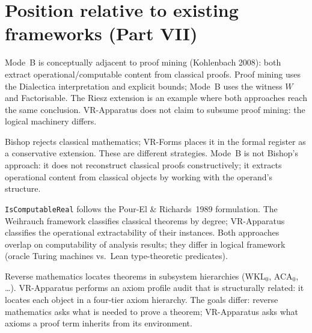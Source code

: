 \section{Position relative to existing frameworks (Part VII)}
\label{sec:apparatus_comparison}

\begin{remark}
\label{rem:compare_kohlenbach}
Mode~B is conceptually adjacent to proof mining (Kohlenbach 2008): both
extract operational/computable content from classical proofs.  Proof
mining uses the Dialectica interpretation and explicit bounds; Mode~B
uses the witness $W$ and Factorisable.  The Riesz extension is an example
where both approaches reach the same conclusion.  VR-Apparatus does not
claim to subsume proof mining: the logical machinery differs.
\end{remark}

\begin{remark}
\label{rem:compare_bishop_apparatus}
Bishop rejects classical mathematics; VR-Forms places it in the formal
register as a conservative extension.  These are different strategies.
Mode~B is not Bishop's approach: it does not reconstruct classical proofs
constructively; it extracts operational content from classical objects by
working with the operand's structure.
\end{remark}

\begin{remark}
\label{rem:compare_computable_analysis}
\texttt{IsComputableReal} follows the Pour-El \& Richards~1989 formulation.
The Weihrauch framework classifies classical theorems by degree; VR-Apparatus
classifies the operational extractability of their instances.  Both
approaches overlap on computability of analysis results; they differ in
logical framework (oracle Turing machines vs.\ Lean type-theoretic predicates).
\end{remark}

\begin{remark}
\label{rem:compare_reverse_math_apparatus}
Reverse mathematics locates theorems in subsystem hierarchies
(WKL$_0$, ACA$_0$, \ldots).  VR-Apparatus performs an axiom profile audit
that is structurally related: it locates each object in a four-tier axiom
hierarchy.  The goals differ: reverse mathematics asks what is needed to
prove a theorem; VR-Apparatus asks what axioms a proof term inherits from
its environment.
\end{remark}

